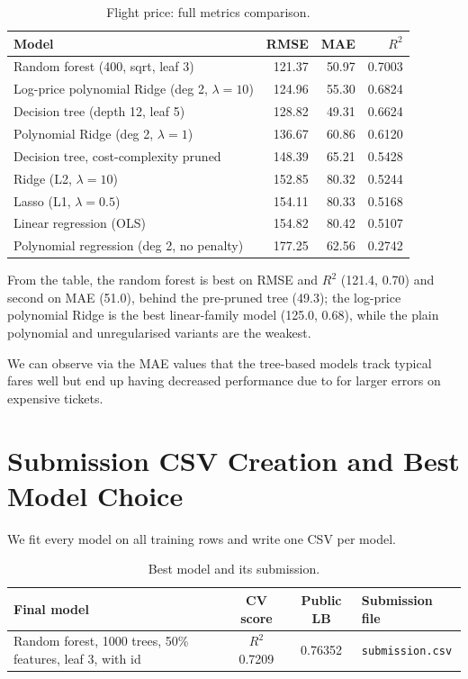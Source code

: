 \documentclass[11pt]{article}
\begin{document}
\begin{table}[H]
\centering
\small
\setlength{\tabcolsep}{5pt}
\begin{tabular}{@{}>{\raggedright\arraybackslash}p{6.2cm}rrr@{}}
\toprule
Model & RMSE & MAE & $R^2$ \\
\midrule
Random forest (400, sqrt, leaf 3) & 121.37 & 50.97 & 0.7003 \\
Log-price polynomial Ridge (deg 2, $\lambda=10$) & 124.96 & 55.30 & 0.6824 \\
Decision tree (depth 12, leaf 5) & 128.82 & 49.31 & 0.6624 \\
Polynomial Ridge (deg 2, $\lambda=1$) & 136.67 & 60.86 & 0.6120 \\
Decision tree, cost-complexity pruned & 148.39 & 65.21 & 0.5428 \\
Ridge (L2, $\lambda=10$) & 152.85 & 80.32 & 0.5244 \\
Lasso (L1, $\lambda=0.5$) & 154.11 & 80.33 & 0.5168 \\
Linear regression (OLS) & 154.82 & 80.42 & 0.5107 \\
Polynomial regression (deg 2, no penalty) & 177.25 & 62.56 & 0.2742 \\
\bottomrule
\end{tabular}
\caption{Flight price: full metrics comparison.}
\end{table}

From the table, the random forest is best on RMSE and $R^2$ (121.4, 0.70) and second on MAE (51.0), behind the pre-pruned tree (49.3); the log-price polynomial Ridge is the best linear-family model (125.0, 0.68), while the plain polynomial and unregularised variants are the weakest.

We can observe via the MAE values that the tree-based models track typical fares well but end up having decreased performance due to for larger errors on expensive tickets. 

\section{Submission CSV Creation and Best Model Choice}

We fit every model on all training rows and write one CSV per model.

\begin{table}[H]
\centering
\caption{Best model and its submission.}
\label{tab:final}
\small
\begin{tabular}{@{}>{\raggedright\arraybackslash}p{4.6cm}cc>{\raggedright\arraybackslash}p{3.4cm}@{}}
\toprule
Final model & CV score & Public LB & Submission file \\
\midrule
Random forest, 1000 trees, 50\% features, leaf 3, with id & $R^2$ 0.7209 & 0.76352 & \texttt{submission.csv} \\
\bottomrule
\end{tabular}
\end{table}
\end{document}
